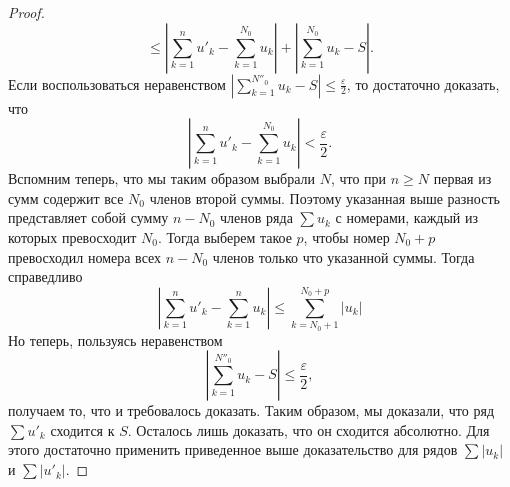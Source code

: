 \begin{theorem}
\begin{proof}
\[            \leqslant
            \left|
                \sum_{k=1}^n u'_k
                -
                \sum_{k=1}^{N_0} u_k
            \right|
            +
            \left|
                \sum_{k=1}^{N_0} u_k
                -
                S
            \right| .
        \]
        Если воспользоваться неравенством $\left|
            \sum_{k=1}^{N''_0} u_k - S
        \right| \leqslant \frac{\varepsilon}{2}$, то достаточно доказать, что
        \[
            \left|
                \sum_{k=1}^n u'_k
                -
                \sum_{k=1}^{N_0} u_k
            \right| < \frac{\varepsilon}{2}.
        \]
        Вспомним теперь, что мы таким образом выбрали $N$, что при $n \geqslant N$ первая из сумм содержит все $N_0$ членов второй суммы. Поэтому указанная выше разность представляет собой сумму $n - N_0$ членов ряда $\sum u_k$ с номерами, каждый из которых превосходит $N_0$.
        \newline
        Тогда выберем такое $p$, чтобы номер $N_0 + p$ превосходил номера всех $n - N_0$ членов только что указанной суммы. Тогда справедливо
        \[
            \left|
                \sum_{k=1}^{n} u'_k
                -
                \sum_{k=1}^{n} u_k
            \right|
            \leqslant
            \sum_{k = N_0 + 1}^{N_0 + p} |u_k|
        \]
        Но теперь, пользуясь неравенством
        \[
            \left|
                \sum_{k=1}^{N''_0} u_k - S
            \right| \leqslant \frac{\varepsilon}{2},
        \]
        получаем то, что и требовалось доказать. Таким образом, мы доказали, что ряд $\sum u'_k$ сходится к $S$. Осталось лишь доказать, что он сходится абсолютно. Для этого достаточно применить приведенное выше доказательство для рядов $\sum |u_k|$ и $\sum |u'_k|$.

    \end{proof}
\end{theorem}